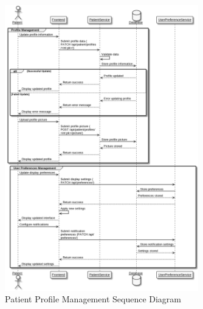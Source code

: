 \begin{figure}[H]
    \centering
    \includegraphics[width=0.75\textwidth]{Patient_Sequence_Diagram.png}
    \caption{Patient Profile Management Sequence Diagram}
    \label{fig:patient-sequence-diagram}
\end{figure}

